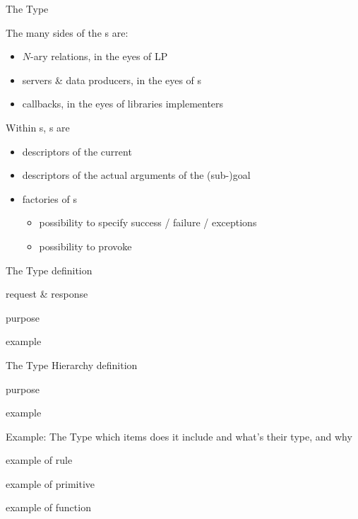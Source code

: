 \documentclass[handout]{beamer}
\begin{document}
\begin{frame}[allowframebreaks]{The  Type}
    \framebreak

    \begin{block}{The many sides of the s}
         are:
        \begin{itemize}
            \item $N$-ary relations, in the eyes of LP
            \item servers \& data producers, in the eyes of s
            \item callbacks, in the eyes of libraries implementers
        \end{itemize}
    \end{block}

    \framebreak

    \begin{block}{Within s, s are}
        \begin{itemize}
            \item descriptors of the \alert{current} 
            \item descriptors of the \alert{actual} arguments of the (sub-)goal
            \item factories of s
            \begin{itemize}
                \item possibility to specify \alert{success} / \alert{failure} / \alert{exceptions}
                \item possibility to provoke \alert{}
            \end{itemize}
        \end{itemize}
    \end{block}
\end{frame}

\begin{frame}[allowframebreaks]{The  Type}
    definition

    request \& response

    purpose

    example
\end{frame}

\begin{frame}[allowframebreaks]{The  Type Hierarchy}
    definition

    purpose

    example
\end{frame}

\begin{frame}[allowframebreaks]{Example: The  Type}
    which items does it include and what's their type, and why

    example of rule

    example of primitive

    example of function
\end{frame}
\end{document}
